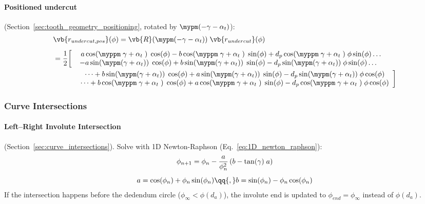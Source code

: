 \paragraph{Positioned undercut} (Section~\ref{sec:tooth_geometry_positioning}, rotated by $\mypm(-\gamma - \alpha_t)$):
\begin{subequations}
\begin{align}
    &\vb{r_{undercut,pos}}(\phi) = \vb{R}(\mypm(-\gamma - \alpha_t))\;\vb{r_{undercut}}(\phi)
\\[1ex]
    &= \frac{1}{2}\bigg[\begin{array}{cc}
            \phantom{-}a\cos(\myppm\;\gamma+\alpha_t\;)\;\cos(\phi)
            - b\cos(\myppm\;\gamma+\alpha_t\;)\;\sin(\phi)
                + d_p\cos(\myppm\;\gamma+\alpha_t\;)\;\phi\sin(\phi)\dots \\
            -a\sin(\mypm(\gamma+\alpha_t))\;\cos(\phi)
                +b\sin(\mypm(\gamma+\alpha_t))\;\sin(\phi)
                - d_p\sin(\mypm(\gamma+\alpha_t))\;\phi\sin(\phi)\dots
        \end{array}
\nonumber\\
        &\phantom{= \frac{1}{2}\bigg[}\begin{array}{cc}
            \hspace{1em}\dots + b\sin(\mypm(\gamma+\alpha_t))\;\cos(\phi)
                + a\sin(\mypm(\gamma+\alpha_t))\;\sin(\phi)
                - d_p\sin(\mypm(\gamma+\alpha_t))\;\phi\cos(\phi)\\
            \hspace{1em}\dots+ b\cos(\myppm\;\gamma+\alpha_t\;)\;\cos(\phi)
                + a\cos(\myppm\;\gamma+\alpha_t\;)\;\sin(\phi)
                - d_p\cos(\myppm\;\gamma+\alpha_t\;)\;\phi\cos(\phi)
        \end{array}\bigg]
\end{align}
\end{subequations}

\subsubsection{Curve Intersections}

\paragraph{Left--Right Involute Intersection} (Section~\ref{sec:curve_intersections}). Solve with 1D Newton-Raphson (Eq.~\eqref{eq:1D_newton_raphson}):
\begin{equation}
    \begin{gathered}
        \phi_{n+1} = \phi_n - \frac{a}{\phi_n^2}\left(b - \tan(\gamma)\;a\right) \\[1ex]
        a = \cos(\phi_n) + \phi_n\sin(\phi_n) \qq{,} b = \sin(\phi_n) - \phi_n\cos(\phi_n)
    \end{gathered}
\end{equation}
If the intersection happens before the dedendum circle ($\phi_\infty < \phi(d_a)$), the involute end is updated to $\phi_{end} = \phi_\infty$ instead of $\phi(d_a)$.

